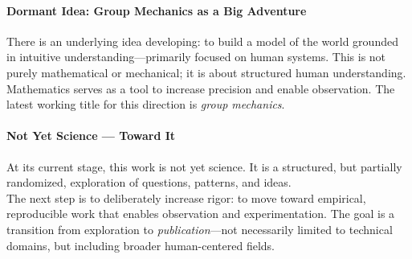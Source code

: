 \paragraph{Dormant Idea: Group Mechanics as a Big Adventure}

There is an underlying idea developing: to build a model of the world grounded in intuitive understanding—primarily focused on human systems. This is not purely mathematical or mechanical; it is about structured human understanding.\\

Mathematics serves as a tool to increase precision and enable observation. The latest working title for this direction is \textit{group mechanics}.

\paragraph{Not Yet Science — Toward It}

At its current stage, this work is not yet science. It is a structured, but partially randomized, exploration of questions, patterns, and ideas.\\

The next step is to deliberately increase rigor: to move toward empirical, reproducible work that enables observation and experimentation. The goal is a transition from exploration to \textit{publication}—not necessarily limited to technical domains, but including broader human-centered fields.
